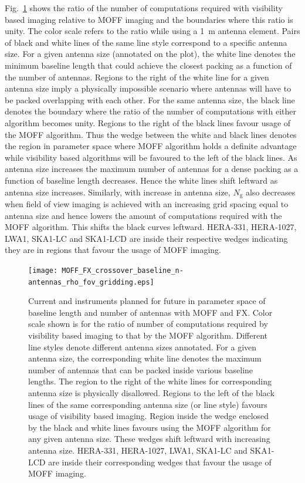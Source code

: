 \documentclass[a4paper,fleqn,usenatbib]{../mnras}
\begin{document}
Fig.~\ref{fig:parameter-space-bll-nant-instruments} shows the ratio of the
number of computations required with visibility based imaging relative to 
MOFF imaging and the boundaries where this ratio is unity. The color scale 
refers to the ratio while using a 1~m antenna element. Pairs of black and
white lines of the same line style correspond to a specific antenna size. For 
a given antenna size (annotated on the plot), the white line denotes the 
minimum baseline length that could achieve the closest packing as a function 
of the number of antennas. Regions to the right of the white line for a 
given antenna size imply a physically impossible scenario where antennas will 
have to be packed overlapping with each other. For the same antenna size, the 
black line denotes the boundary where the ratio of the number of computations 
with either algorithm becomes unity. Regions to the right of the black lines 
favour usage of the MOFF algorithm. Thus the wedge between the white and black 
lines denotes the region in parameter space where MOFF algorithm holds a 
definite advantage while visibility based algorithms will be favoured to the 
left of the black lines. As antenna size increases the maximum number of 
antennas for a dense packing as a function of baseline length decreases. Hence 
the white lines shift leftward as antenna size increases. Similarly, with 
increase in antenna size, $N_\textrm{g}$ also decreases when field of view 
imaging is achieved with an increasing grid spacing equal to antenna size and
hence lowers the amount of computations required with the MOFF algorithm. This
shifts the black curves leftward. HERA-331, HERA-1027, LWA1, SKA1-LC and 
SKA1-LCD are inside their respective wedges indicating they are in regions that
favour the usage of MOFF imaging.

\begin{figure}
  \texttt{[image: MOFF\_FX\_crossover\_baseline\_n-antennas\_rho\_fov\_gridding.eps]}
  \caption{Current and instruments planned for future in parameter space of
    baseline length and number of antennas with MOFF and FX. Color scale shown 
    is for the ratio of number of computations required by visibility based
    imaging to that by the MOFF algorithm. Different line styles denote 
    different antenna sizes annotated. For a given antenna size, the 
    corresponding white line denotes the maximum number of antennas that can 
    be packed inside various baseline lengths. The region to the right of the 
    white lines for corresponding antenna size is physically disallowed. 
    Regions to the left of the black lines of the same corresponding antenna 
    size (or line style) favours usage of visibility based imaging. Region 
    inside the wedge enclosed by the black and white lines favours using the 
    MOFF algorithm for any given antenna size. These wedges shift leftward with 
    increasing antenna size. HERA-331, HERA-1027, LWA1, SKA1-LC and SKA1-LCD
    are inside their corresponding wedges that favour the usage of MOFF 
    imaging.}
  \label{fig:parameter-space-bll-nant-instruments}
\end{figure}
\end{document}
